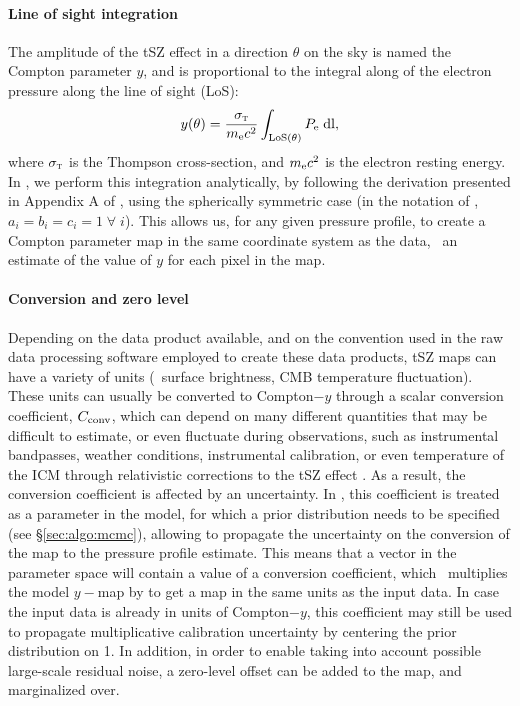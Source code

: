 \paragraph{Line of sight integration}

The amplitude of the tSZ effect in a direction $\theta$ on the sky is named the Compton parameter $y$, and is proportional to the integral along of the electron pressure along the line of sight (LoS):
\begin{equation}
    \label{eq:algo_ysz}
    y(\theta) = \frac{\sigma_\textsc{t}}{m_{\rm e}c^2} \int_{\rm LoS(\theta)} P_{\rm e} \; \dd l,
\end{equation}
where $\sigma_\textsc{t}$ is the Thompson cross-section, and $m_{\rm e} c^2$ is the electron resting energy. \\
In \panco, we perform this integration analytically, by following the derivation presented in Appendix A of \citet{romero_multi-instrument_2018}, using the spherically symmetric case (in the notation of \citeauthor{romero_multi-instrument_2018}, $a_i = b_i = c_i = 1 \; \forall \; i$).
This allows us, for any given pressure profile, to create a Compton parameter map in the same coordinate system as the data, \ie\ an estimate of the value of $y$ for each pixel in the map.

\paragraph{Conversion and zero level}

Depending on the data product available, and on the convention used in the raw data processing software employed to create these data products, tSZ maps can have a variety of units (\eg\ surface brightness, CMB temperature fluctuation).
These units can usually be converted to Compton$-y$ through a scalar conversion coefficient, $C_{\rm conv}$, which can depend on many different quantities that may be difficult to estimate, or even fluctuate during observations, such as instrumental bandpasses, weather conditions, instrumental calibration, or even temperature of the ICM through relativistic corrections to the tSZ effect \citep{mroczkowski_astrophysics_2019}.
As a result, the conversion coefficient is affected by an uncertainty.
In \panco, this coefficient is treated as a parameter in the model, for which a prior distribution needs to be specified (see \S\ref{sec:algo:mcmc}), allowing to propagate the uncertainty on the conversion of the map to the pressure profile estimate.
This means that a vector in the parameter space will contain a value of a conversion coefficient, which \panco\ multiplies the model $y-$map by to get a map in the same units as the input data.
In case the input data is already in units of Compton$-y$, this coefficient may still be used to propagate multiplicative calibration uncertainty by centering the prior distribution on 1.
In addition, in order to enable taking into account possible large-scale residual noise, a zero-level offset can be added to the map, and marginalized over.


